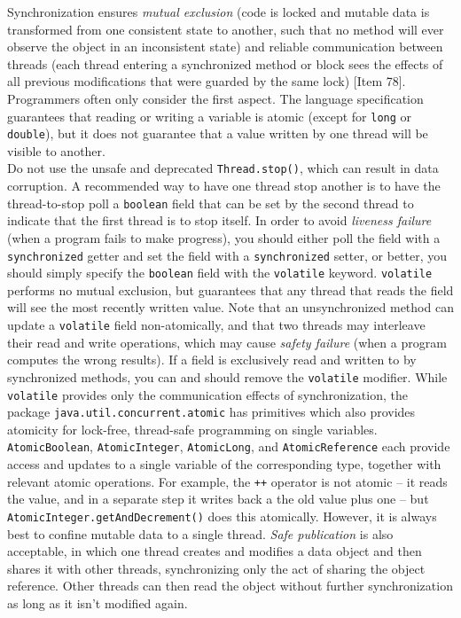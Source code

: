 \documentclass[8pt, table, xcdraw]{article}%
\begin{document}
Synchronization ensures \emph{mutual exclusion} (code is locked and mutable data is transformed from one consistent state to another, such that no method will ever observe the object in an inconsistent state) and reliable communication between threads (each thread entering a synchronized method or block sees the effects of all previous modifications that were guarded by the same lock) [Item 78]. Programmers often only consider the first aspect. The language specification guarantees that reading or writing a variable is atomic (except for \lstinline{long} or \lstinline{double}), but it does not guarantee that a value written by one thread will be visible to another.\\
Do not use the unsafe and deprecated \lstinline{Thread.stop()}, which can result in data corruption. A recommended way to have one thread stop another is to have the thread-to-stop poll a \lstinline{boolean} field that can be set by the second thread to indicate that the first thread is to stop itself. In order to avoid \emph{liveness failure} (when a program fails to make progress), you should either poll the field with a \lstinline{synchronized} getter and set the field with a \lstinline{synchronized} setter, or better, you should simply specify the \lstinline{boolean} field with the \lstinline{volatile} keyword. \lstinline{volatile} performs no mutual exclusion, but guarantees that any thread that reads the field will see the most recently written value. Note that an unsynchronized method can update a \lstinline{volatile} field non-atomically, and that two threads may interleave their read and write operations, which may cause \emph{safety failure} (when a program computes the wrong results). If a field is exclusively read and written to by synchronized methods, you can and should remove the \lstinline{volatile} modifier. While \lstinline{volatile} provides only the communication effects of synchronization, the package \lstinline{java.util.concurrent.atomic} has primitives which also provides atomicity for lock-free, thread-safe programming on single variables. \lstinline{AtomicBoolean}, \lstinline{AtomicInteger}, \lstinline{AtomicLong}, and \lstinline{AtomicReference} each provide access and updates to a single variable of the corresponding type, together with relevant atomic operations. For example, the \lstinline{++} operator is not atomic -- it reads the value, and in a separate step it writes back a the old value plus one -- but \lstinline{AtomicInteger.getAndDecrement()} does this atomically. However, it is always best to confine mutable data to a single thread. \emph{Safe publication} is also acceptable, in which one thread creates and modifies a data object and then shares it with other threads, synchronizing only the act of sharing the object reference. Other threads can then read the object without further synchronization as long as it isn't modified again.
\end{document}
